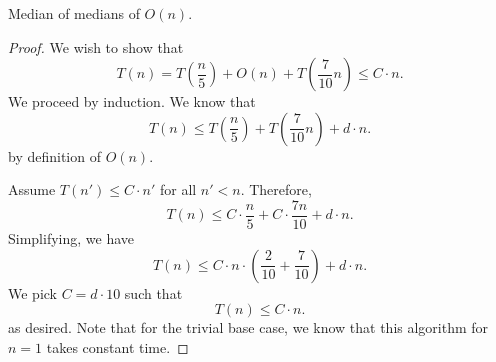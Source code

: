 
\begin{theorem}
	Median of medians of \( O(n) \).
\end{theorem}
\begin{proof}
	We wish to show that \[
		T(n) = T\left(\frac{n}{5}\right) + O(n) + T\left(\frac{7}{10}n \right) \le C \cdot n
	.\] We proceed by induction. We know that \[
		T(n) \le T \left( \frac{n}{5} \right) + T \left( \frac{7}{10}n \right) + d\cdot n
	.\] by definition of \( O(n) \).

	Assume \( T(n') \le C \cdot n'\) for all \( n' < n \). Therefore, \[
		T(n) \le C \cdot \frac{n}{5} + C \cdot \frac{7n}{10} + d\cdot n
	.\] Simplifying, we have \[
		T(n) \le C \cdot n \cdot  \left(\frac{2}{10} + \frac{7}{10}\right) + d \cdot n
	.\] We pick \( C = d \cdot 10 \) such that \[
		T(n) \le C \cdot n
	.\] as desired. Note that for the trivial base case, we know that this algorithm for \( n=1 \) takes constant time.
\end{proof}
